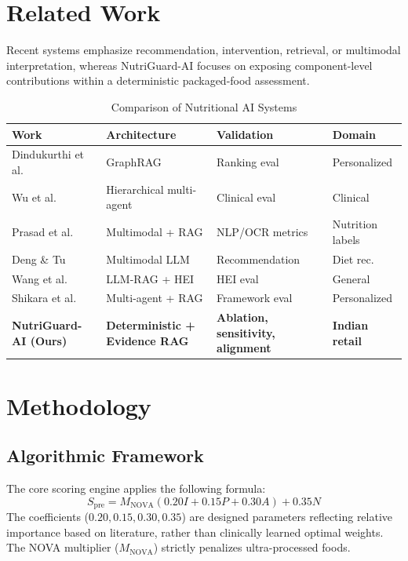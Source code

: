 \documentclass[conference]{IEEEtran}
\begin{document}
\section{Related Work}
Recent systems emphasize recommendation, intervention, retrieval, or multimodal interpretation, whereas NutriGuard-AI focuses on exposing component-level contributions within a deterministic packaged-food assessment.
\begin{table}[h]
\caption{Comparison of Nutritional AI Systems}
\begin{center}
\begin{tabular}{|p{2cm}|p{2cm}|p{2cm}|p{1.5cm}|}
\hline
\textbf{Work} & \textbf{Architecture} & \textbf{Validation} & \textbf{Domain} \\
\hline
Dindukurthi et al. \cite{ref1} & GraphRAG & Ranking eval & Personalized \\
Wu et al. \cite{ref2} & Hierarchical multi-agent & Clinical eval & Clinical \\
Prasad et al. \cite{ref3} & Multimodal + RAG & NLP/OCR metrics & Nutrition labels \\
Deng \& Tu \cite{ref4} & Multimodal LLM & Recommendation & Diet rec. \\
Wang et al. \cite{ref5} & LLM-RAG + HEI & HEI eval & General \\
Shikara et al. \cite{ref6} & Multi-agent + RAG & Framework eval & Personalized \\
\textbf{NutriGuard-AI (Ours)} & \textbf{Deterministic + Evidence RAG} & \textbf{Ablation, sensitivity, alignment} & \textbf{Indian retail} \\
\hline
\end{tabular}
\end{center}
\end{table}

\section{Methodology}
\subsection{Algorithmic Framework}
The core scoring engine applies the following formula:
\begin{equation}
S_{\mathrm{pre}} = M_{\mathrm{NOVA}}(0.20I + 0.15P + 0.30A) + 0.35N
\end{equation}
The coefficients ($0.20, 0.15, 0.30, 0.35$) are designed parameters reflecting relative importance based on literature, rather than clinically learned optimal weights. The NOVA multiplier ($M_{\mathrm{NOVA}}$) strictly penalizes ultra-processed foods.
\end{document}
